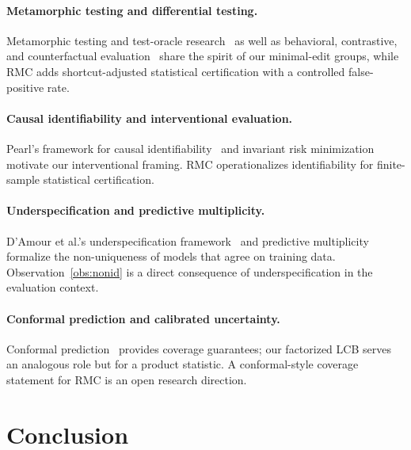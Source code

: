 \documentclass[conference]{IEEEtran}
\theoremstyle{remark}
\begin{document}
\paragraph{Metamorphic testing and differential testing.}
Metamorphic testing and test-oracle research~\cite{chen2020metamorphic,barr2015oracle} as well as behavioral, contrastive, and counterfactual evaluation~\cite{ribeiro2020checklist,gardner2020contrast,kaushik2020counterfactual} share the spirit of our minimal-edit groups, while RMC adds shortcut-adjusted statistical certification with a controlled false-positive rate.

\paragraph{Causal identifiability and interventional evaluation.}
Pearl's framework for causal identifiability~\cite{pearl2009causality} and invariant risk minimization~\cite{arjovsky2019invariant} motivate our interventional framing.
RMC operationalizes identifiability for finite-sample statistical certification.

\paragraph{Underspecification and predictive multiplicity.}
D'Amour et al.'s underspecification framework~\cite{damour2022underspecification} and predictive multiplicity~\cite{marx2020predictive,watson2023predictive} formalize the non-uniqueness of models that agree on training data.
Observation~\ref{obs:nonid} is a direct consequence of underspecification in the evaluation context.

\paragraph{Conformal prediction and calibrated uncertainty.}
Conformal prediction~\cite{vovk2005algorithmic} provides coverage guarantees; our factorized LCB serves an analogous role but for a product statistic.
A conformal-style coverage statement for RMC is an open research direction.


\section{Conclusion}
\label{sec:conclusion}
\end{document}
